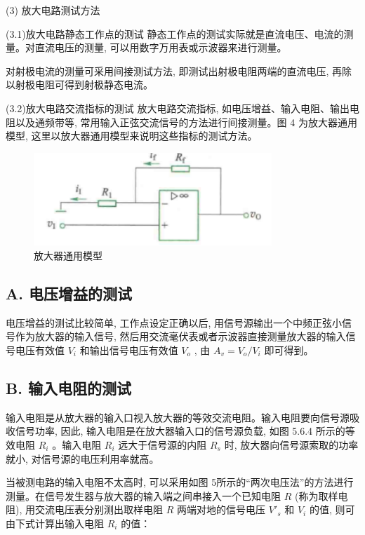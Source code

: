 \documentclass[10pt, a4paper]{article} %
\begin{document}
(3) 放大电路测试方法

(3.1)放大电路静态工作点的测试
静态工作点的测试实际就是直流电压、电流的测量。对直流电压的测量, 可以用数字万用表或示波器来进行测量。

对射极电流的测量可采用间接测试方法, 即测试出射极电阻两端的直流电压, 再除以射极电阻可得到射极静态电流。

(3.2)放大电路交流指标的测试
放大电路交流指标, 如电压增益、输入电阻、输出电阻以及通频带等, 常用输入正弦交流信号的方法进行间接测量。图 4 为放大器通用模型, 这里以放大器通用模型来说明这些指标的测试方法。

\begin{figure}[ht]
    \centering
    \includegraphics[width=0.8\textwidth]{image/4.png}
    \caption{放大器通用模型}
    \label{fig:amplifier_model}
\end{figure}

\subsection*{A. 电压增益的测试}
电压增益的测试比较简单, 工作点设定正确以后, 用信号源输出一个中频正弦小信号作为放大器的输入信号, 然后用交流毫伏表或者示波器直接测量放大器的输入信号电压有效值  $ V_i $  和输出信号电压有效值  $ V_o $ , 由  $ A_v = V_o / V_i $  即可得到。

\subsection*{B. 输入电阻的测试}
输入电阻是从放大器的输入口视入放大器的等效交流电阻。输入电阻要向信号源吸收信号功率, 因此, 输入电阻是在放大器输入口的信号源负载, 如图 5.6.4 所示的等效电阻  $ R_i $ 。输入电阻  $ R_i $  远大于信号源的内阻  $ R_s $  时, 放大器向信号源索取的功率就小, 对信号源的电压利用率就高。

当被测电路的输入电阻不太高时, 可以采用如图 5所示的“两次电压法”的方法进行测量。在信号发生器与放大器的输入端之间串接入一个已知电阻  $ R $ (称为取样电阻), 用交流电压表分别测出取样电阻  $ R $  两端对地的信号电压  $ V'_s $  和  $ V_i $  的值, 则可由下式计算出输入电阻  $ R_i $  的值：
\end{document}
